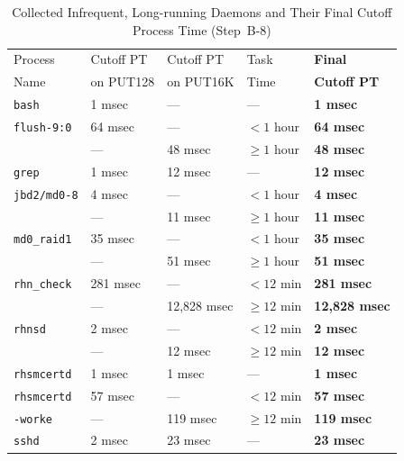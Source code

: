 \documentclass[letter]{ieice}
\begin{document}
\vspace{-0.2in}
\begin{table}[h]
\centering
{\scriptsize
\begin{tabular}{|p{1.2cm}|p{1.2cm}|p{1.4cm}|p{1cm}|p{1.45cm}|} \hline
{\tiny Process}  & {\tiny Cutoff PT} & {\tiny Cutoff PT} & {\tiny Task}  & {\tiny{\bf Final }} \\
{\tiny Name} & {\tiny on PUT128}  & {\tiny on PUT16K} & {\tiny Time} & {\tiny {\bf Cutoff PT}} \\\hline
{\tt bash} & 1 msec & --- & --- & {\bf 1 msec} \\ \hline
{\tt flush-9:0} & 64 msec & --- & $< 1$ hour & {\bf 64 msec} \\
                & ---     & 48 msec & $\geq 1$ hour & {\bf 48 msec} \\ \hline
{\tt grep }     & 1 msec & 12 msec & --- & {\bf 12 msec}\\ \hline
{\tt jbd2/md0-8} & 4 msec & --- & $< 1$ hour & {\bf 4 msec} \\
                & ---     & 11 msec & $\geq 1$ hour & {\bf 11 msec} \\ \hline
{\tt md0\_raid1} & 35 msec & ---     & $< 1$ hour  & {\bf 35 msec}\\
                 & ---     & 51 msec & $\geq 1$ hour & {\bf 51 msec} \\ \hline
{\tt rhn\_check}  & 281 msec & --- & $< 12$ min & {\bf 281 msec} \\
                 &  --- & 12,828 msec & $\geq 12$ min & {\bf 12,828 msec}\\ \hline
{\tt rhnsd} & 2 msec & --- & $< 12$ min & {\bf 2 msec} \\
            & ---    & 12 msec &$\geq 12$ min & {\bf 12 msec} \\ \hline
{\tt rhsmcertd}  & 1 msec & 1 msec & --- & {\bf 1 msec} \\  \hline
{\tt rhsmcertd}  & 57 msec & --- & $< 12$ min & {\bf 57 msec} \\
{\tt -worke}           &  --- & 119 msec  & $\geq 12$ min & {\bf 119 msec}\\ \hline
{\tt sshd} & 2 msec & 23 msec & --- & {\bf 23 msec}\\ \hline
\end{tabular}
}
\caption{Collected Infrequent, Long-running Daemons and Their Final Cutoff
  Process Time \hbox{({\color{blue}Step~B-8})}\label{tab:final_infrequent_cutoff}}
  \vspace{-0.25in}
\end{table}
\end{document}
